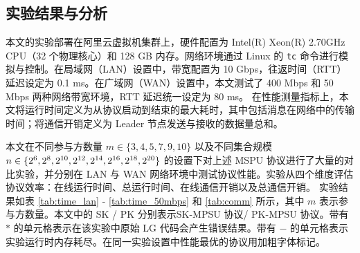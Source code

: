 \subsection{实验结果与分析}

本文的实验部署在阿里云虚拟机集群上，硬件配置为 Intel(R) Xeon(R) 2.70GHz CPU（32 个物理核心）和 128 GB 内存。网络环境通过 Linux 的 \texttt{tc} 命令进行模拟与控制。在局域网（LAN）设置中，带宽配置为 10 Gbps，往返时间（RTT）延迟设定为 0.1 ms。在广域网（WAN）设置中，本文测试了 400 Mbps 和 50 Mbps 两种网络带宽环境，RTT 延迟统一设定为 80 ms。
在性能测量指标上，本文将运行时间定义为从协议启动到结束的最大耗时，其中包括消息在网络中的传输时间；将通信开销定义为 Leader 节点发送与接收的数据量总和。

本文在不同参与方数量 $m \in \{3,4,5,7,9,10\}$ 以及不同集合规模 
$n \in \{2^6,2^8,2^{10},2^{12},\\ 2^{14},2^{16},2^{18},2^{20}\}$ 的设置下对上述 MSPU 协议进行了大量的对比实验，并分别在 LAN 与 WAN 网络环境中测试协议性能。实验从四个维度评估协议效率：在线运行时间、总运行时间、在线通信开销以及总通信开销。
实验结果如表 \ref{tab:time_lan} - \ref{tab:time_50mbps} 和 \ref{tab:comm} 所示，其中 $m$ 表示参与方数量。本文中的 SK / PK 分别表示SK-MPSU 协议/ PK-MPSU 协议。带有 $*$ 的单元格表示在该实验中原始 LG 代码会产生错误结果。带有 $-$ 的单元格表示实验运行时内存耗尽。在同一实验设置中性能最优的协议用加粗字体标记。

